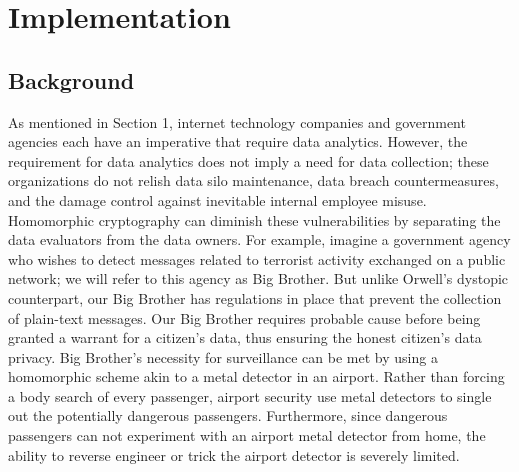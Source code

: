 \documentclass[10pt, a4paper]{article}
\begin{document}
	
	\section{Implementation}
	\subsection{Background}
	As mentioned in Section 1, internet technology companies and government agencies each have an imperative that require data analytics. However, the requirement for data analytics does not imply a need for data collection;  these organizations do not relish data silo maintenance, data breach countermeasures, and the damage control against inevitable internal employee misuse. Homomorphic cryptography can diminish these vulnerabilities by separating the data evaluators from the data owners. For example, imagine a government agency who wishes to detect messages related to terrorist activity exchanged on a public network; we will refer to this agency as Big Brother. But unlike Orwell's dystopic counterpart, our Big Brother has regulations in place that prevent the collection of plain-text messages. Our Big Brother requires probable cause before being granted a warrant for a citizen's data, thus ensuring the honest citizen's data privacy. Big Brother's necessity for surveillance can be met by using a homomorphic scheme akin to a metal detector in an airport. Rather than forcing a body search of every passenger, airport security use metal detectors to single out the potentially dangerous passengers. Furthermore, since dangerous passengers can not experiment with an airport metal detector from home, the ability to reverse engineer or trick the airport detector is severely limited.  
\end{document}

